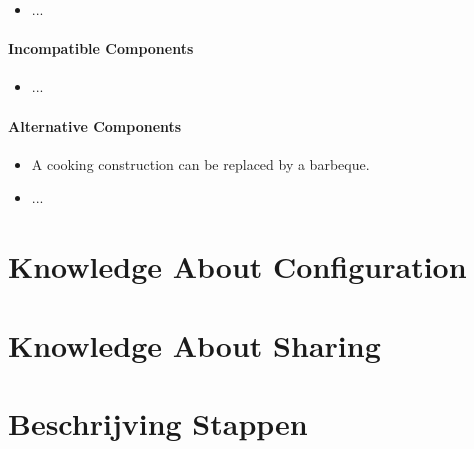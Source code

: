 \documentclass[a4paper,11pt]{article}
\begin{document}
\begin{itemize}
\item ...
\end{itemize}

\paragraph{Incompatible Components}

\begin{itemize}
\item ...
\end{itemize}

\paragraph{Alternative Components}

\begin{itemize}
\item A cooking construction can be replaced by a barbeque.
\item ...
\end{itemize}


\section*{Knowledge About Configuration}


\section*{Knowledge About Sharing}


\section*{Beschrijving Stappen}
\end{document}

